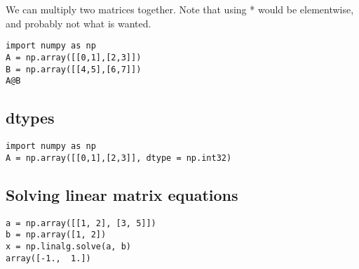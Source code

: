 We can multiply two matrices together. Note that using * would be elementwise, and probably not what is wanted.


\begin{verbatim}
import numpy as np
A = np.array([[0,1],[2,3]])
B = np.array([[4,5],[6,7]])
A@B
\end{verbatim}


\subsection{dtypes}


\begin{verbatim}
import numpy as np
A = np.array([[0,1],[2,3]], dtype = np.int32)
\end{verbatim}

\subsection{Solving linear matrix equations}
\begin{verbatim}
a = np.array([[1, 2], [3, 5]])
b = np.array([1, 2])
x = np.linalg.solve(a, b)
array([-1.,  1.])
\end{verbatim}
